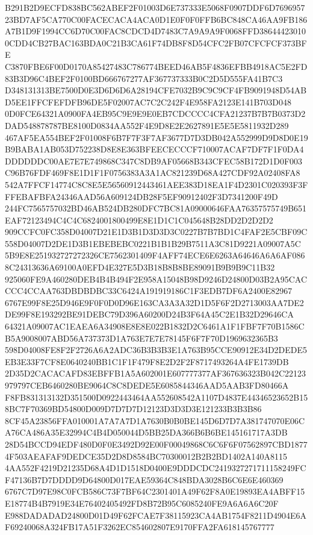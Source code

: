 \documentclass[UTF8,fontset=fandol,zihao=-4,a4paper]{ctexart}
\begin{document}
{{B291B2D9ECFD838BC562ABEF2F01003D6E737333E5068F0907DDF6D769695723BD7AF5CA770C00FACECACA4ACA0D1E0F0F0FFB6BC848CA46AA9FB186
A7B1D9F1994CC6D70C00FAC8CDCD4D7483C7A9A9A9F0068FFD386444230100CDD4CB27BAC163BDA0C21B3CA61F74DB8F8D54CFC2FB07CFCFCF373BFE
C3870FBE6F00D0170A85427483C786774BEED46AB5F4836EFBB4918AC5E2FD83B3D96C4BEF2F0100BD666767277AF367737333B0C2D5D555FA41B7C3
D348131313BE7500D0E3D6D6D6A28194CFE7032B9C9C9CF4FB9091948D54ABD5EE1FFCFEFDFB96DE5F02007AC7C2C242F4E958FA2123E141B703D048
0D0FCE64321A0900FA4EB95C9E9E9E0EB7CDCCCC4CFA21237B7B7B0373D2DAD548878787BE8100D0834AA552F4E9D8E2E2627891E5E5E5811932D289
467AF5EA554BEF2F01008F6B7F7F3F7AF3677D7D3DB042A552999D9D8D0E19B9BABA1AB053D752238D8E8E363BFEECECCCF710007ACAF7DF7F1F0DA4
DDDDDDC00AE7E7E749868C347C8DB9AF05668B343CFEC58B172D1D0F003C96B76FDF469F8E1D1F1F0756383A3A1AC821239D68A427CDF92A02408FA8
542A7FFCF14774C8C8E5E56560912443461AEE383D18EA1F4D2301C020393F3FFFEBAFBFA24346AAD56A609124DB28F5EF90912402F3D7341200F49D
244FC7565757032BD46AB524DB280DFC7BC81A09000646FAA76357575749B651EAF72123494C4C4C6824001800499E8E1D1C1C045648B28DD2D2D2D2
909CCFC0FC358D04007D21E1D3B1D3D3D3C0227B7B7BD1C4FAF2E5CBF09C558D04007D2DE1D3B1EBEBEBC0221B1B1B29B7511A3C81D9221A09007A5C
5B9E8E251932727272326CE7562301409F4AFF74ECE6E6263A64646A6A6AF0868C24313636A69100A0EFD4E327E5D3B18B8B8BE89091B9B9B9C11B32
925060FE9A460280DEB4B4B494F2E958A15048B98D9246D24800D03B2A95CACCCC4CCAA763DBDBDBC33C6424A191919186C1F3EDB7DF6A2400E82967
6767E99F8E25D946E9F0F0D0D96E163CA3A3A32D1D5F6F2D2713003AA7DE2DE99F8E193292BE91DEBC79D396A60200D24B3F64A45C2E1B32D29646CA
64321A09007AC1EAEA6A34908E8E8E022B1832D2C6461A1F1FBF7F70B1586CB5A9008007ABD56A737373D1A763E7E7E78145F6F7F70D1969632365B3
598D04008FE8F2F2726A6A2ADC36B3B3B3E1A763B95CCE90912E34D2DEDE5EB3E33F7CF8E0640240BB1C1F1F479F8E2D2F2F8717493264A4FE1739DB
2D35D2CACACAFD83EBFFB1A5A602001E607777377AF367636323B042C22123979797CEB6460280BE9064C8C8DEDE5E6085844346AAD5AAB3FD80466A
F8FB831313132D351500D0922443464AA552608542A1107D4837E44346523652B158BC7F70369BD54800D009D7D7D7D12123D3D3D3E121233B3B3B86
8CF45A23856FFA010001A7A7A7D1A7630B0B0BE145D6D7D7A381747070E06CA76CA486A35E32994C4B4D050044D5BB25DA366B6B6BE145161717A3DB
28D54BCCD94EDF480D0F0E3492D92E00F00049868C6C6F6F07562897CBD18774F503AEAFAF9DEDCE35D2D8D8584BC70300012B2B2BD1402A140A8115
4AA552F4219D21235D68A4D1D1518D0400E9DDDCDC2419327271711158249FCF47136B7D7DDDD9D64800D017EAE59364C848BDA3028B6C6E6E460369
6767C7D97E98C0FCB586C73F7BF64C2301401A49F62F8A0E19893EA4ABFF15E18774B4B7919E34E76402405492FD8B72B95C6085240FE9A6A6A6C20F
E988DADADAD24800D01D49F62FCAE7F38115923CA4AB1754F8211D4904E6AF69240068A324FB17A51F3262EC854602807E9170FFA2FA618145767777
}}
\end{document}
